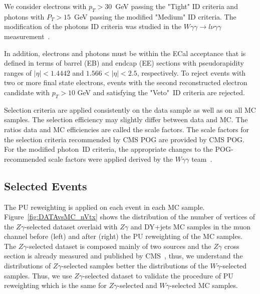 We consider electrons with $p_T>30$~GeV passing the "Tight" ID criteria and photons with $P_T>15$~GeV passing the modified "Medium" ID criteria. The modification of the photons ID criteria was studied in the $W\gamma\gamma \rightarrow l\nu\gamma\gamma$ measurement~\cite{ref_Wgg8TeV}. 

In addition, electrons and photons must be within the ECal acceptance that is defined in terms of barrel (EB) and endcap (EE) sections with pseudorapidity ranges of $|\eta| < 1.4442$ and $1.566 < |\eta| < 2.5$, respectively. To reject events with two or more final state electrons, events with the second reconstructed electron candidate with $p_T>10$ GeV and satisfying the "Veto"~ID criteria are rejected. %

Selection criteria are applied consistently on the data sample as well as on all MC samples. The selection efficiency may slightly differ between data and MC. The ratios data and MC efficiencies are called the scale factors. The scale factors for the selection criteria recommended by CMS POG are provided by CMS POG. For the modified photon~ID criteria, the appropriate changes to the POG-recommended scale factors were applied derived by the $W\gamma\gamma$ team~\cite{ref_Wgg8TeV}.



\subsection{Selected Events}


The PU reweighting is applied on each event in each MC sample. Figure~\ref{fig:DATAvsMC_nVtx} shows the distribution of the number of vertices of the $Z\gamma$-selected dataset overlaid with $Z\gamma$ and DY+jets MC samples in the muon channel before (left) and after (right) the PU reweighting of the MC samples. The $Z\gamma$-selected dataset is composed mainly of two sources and the $Z\gamma$ cross section is already measured and published by CMS~\cite{ref_Zg8TeV}, thus, we understand the distributions of $Z\gamma$-selected samples better the distributions of the $W\gamma$-selected samples. Thus, we use $Z\gamma$-selected dataset to validate the procedure of PU reweighting which is the same for $Z\gamma$-selected and $W\gamma$-selected MC samples.

